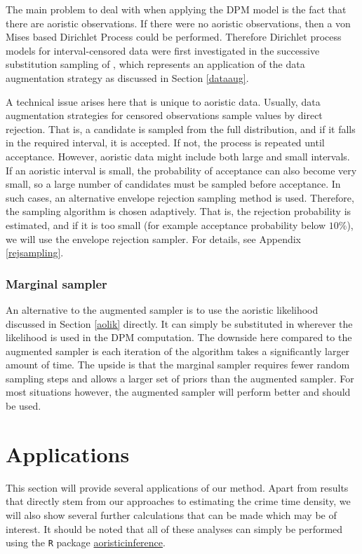 The main problem to deal with when applying the DPM model is the fact that there are aoristic observations. If there were no aoristic observations, then a von Mises based Dirichlet Process could be performed. Therefore  Dirichlet process models for interval-censored data were first investigated in the successive substitution sampling of \citet{doss1994bayesian}, which represents an application of the data augmentation strategy as discussed in Section \ref{dataaug}.

A technical issue arises here that is unique to aoristic data. Usually, data augmentation strategies for censored observations sample values by direct rejection. That is, a candidate is sampled from the full distribution, and if it falls in the required interval, it is accepted. If not, the process is repeated until acceptance. However, aoristic data might include both large and small intervals. If an aoristic interval is small, the probability of acceptance can also become very small, so a large number of candidates must be sampled before acceptance. In such cases, an alternative envelope rejection sampling method is used.  Therefore, the sampling algorithm is chosen adaptively. That is, the rejection probability is estimated, and if it is too small (for example acceptance probability below $10\%$), we will use the envelope rejection sampler. For details, see Appendix \ref{rejsampling}.

\subsubsection{Marginal sampler}

An alternative to the augmented sampler is to use the aoristic likelihood discussed in Section \ref{aolik} directly. It can simply be substituted in wherever the likelihood is used in the DPM computation. The downside here compared to the augmented sampler is each iteration of the algorithm takes a significantly larger amount of time. The upside is that the marginal sampler requires fewer random sampling steps and allows a larger set of priors than the augmented sampler. For most situations however, the augmented sampler will perform better and should be used.

\section{Applications} \label{applications}

This section will provide several applications of our method. Apart from results that directly stem from our approaches to estimating the crime time density, we will also show several further calculations that can be made which may be of interest. It should be noted that all of these analyses can simply be performed using the \texttt{R} package \href{https://github.com/keesmulder/aoristicinference}{aoristicinference}.















